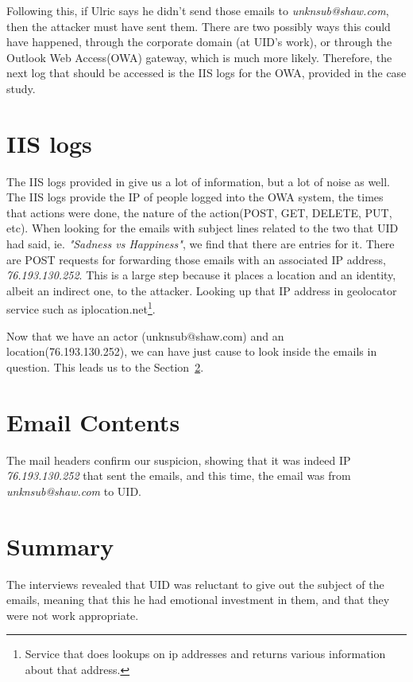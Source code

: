 \documentclass{article}
\numberwithin{equation}{section} %
\numberwithin{figure}{section} %
\numberwithin{table}{section} %
\begin{document}
Following this, if Ulric says he didn't send those emails to \textit{unknsub@shaw.com}, then the attacker must have sent them.  There are two possibly ways this could have happened, through the corporate domain (at UID's work), or through the Outlook Web Access(OWA) gateway, which is much more likely.  Therefore, the next log that should be accessed is the IIS logs for the OWA, provided in the case study\cite{iis}. 

\section{IIS logs}
The IIS logs provided in\cite{iis} give us a lot of information, but a lot of noise as well.  The IIS logs provide the IP of people logged into the OWA system, the times that actions were done, the nature of the action(POST, GET, DELETE, PUT, etc).  When looking for the emails with subject lines related to the two that UID had said, ie. \textit{"Sadness vs Happiness"}, we find that there are entries for it.  There are POST requests for forwarding those emails with an associated IP address, \textit{76.193.130.252}.  This is a large step because it places a location and an identity, albeit an indirect one, to the attacker.  Looking up that IP address in geolocator service such as iplocation.net\footnote{Service that does lookups on ip addresses and returns various information about that address.}.

Now that we have an actor (unknsub@shaw.com) and an location(76.193.130.252), we can have just cause to look inside the emails in question.  This leads us to the Section~\ref{sec:emailheaders}.

\section{Email Contents}
\label{sec:emailheaders}
The mail headers confirm our suspicion, showing that it was indeed IP \textit{76.193.130.252} that sent the emails, and this time, the email was from \textit{unknsub@shaw.com} to UID.

\section{Summary}
The interviews revealed that UID was reluctant to give out the subject of the emails, meaning that this he had emotional investment in them, and that they were not work appropriate.  \\
\end{document}
